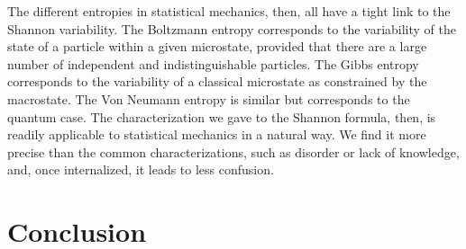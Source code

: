 \documentclass{article}
\begin{document}
The different entropies in statistical mechanics, then, all have a tight link to the Shannon variability. The Boltzmann entropy corresponds to the variability of the state of a particle within a given microstate, provided that there are a large number of independent and indistinguishable particles. The Gibbs entropy corresponds to the variability of a classical microstate as constrained by the macrostate. The Von Neumann entropy is similar but corresponds to the quantum case. The characterization we gave to the Shannon formula, then, is readily applicable to statistical mechanics in a natural way. We find it more precise than the common characterizations, such as disorder or lack of knowledge, and, once internalized, it leads to less confusion.


\section{Conclusion}

  

\end{document}
